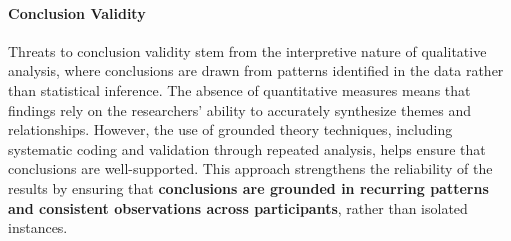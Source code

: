 \paragraph{Conclusion Validity}
Threats to conclusion validity stem from the interpretive nature of qualitative analysis, where conclusions are drawn from patterns identified in the data rather than statistical inference. The absence of quantitative measures means that findings rely on the researchers’ ability to accurately synthesize themes and relationships. However, the use of grounded theory techniques, including systematic coding and validation through repeated analysis, helps ensure that conclusions are well-supported. This approach strengthens the reliability of the results by ensuring that \textbf{conclusions are grounded in recurring patterns and consistent observations across participants}, rather than isolated instances.